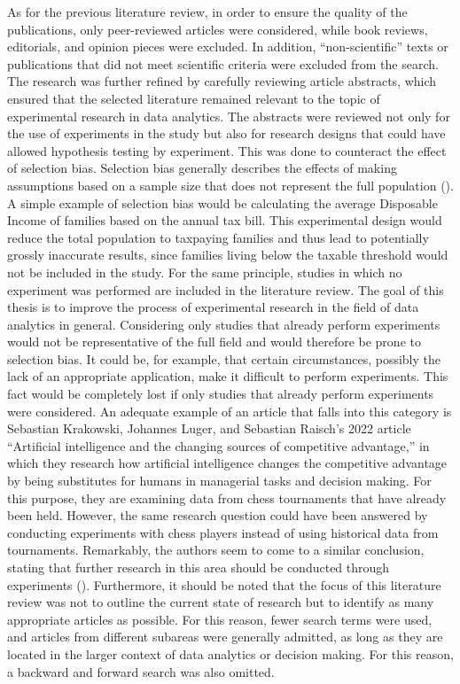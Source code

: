 As for the previous literature review, in order to ensure the quality of the publications, only peer-reviewed articles were considered, while book reviews, editorials, and opinion pieces were excluded. In addition, \enquote{non-scientific} texts or publications that did not meet scientific criteria were excluded from the search. The research was further refined by carefully reviewing article abstracts, which ensured that the selected literature remained relevant to the topic of experimental research in data analytics. The abstracts were reviewed not only for the use of experiments in the study but also for research designs that could have allowed hypothesis testing by experiment. This was done to counteract the effect of selection bias. Selection bias generally describes the effects of making assumptions based on a sample size that does not represent the full population (\cite{Heckman.2010}). A simple example of selection bias would be calculating the average Disposable Income of families based on the annual tax bill. This experimental design would reduce the total population to taxpaying families and thus lead to potentially grossly inaccurate results, since families living below the taxable threshold would not be included in the study. For the same principle, studies in which no experiment was performed are included in the literature review. The goal of this thesis is to improve the process of experimental research in the field of data analytics in general. Considering only studies that already perform experiments would not be representative of the full field and would therefore be prone to selection bias. It could be, for example, that certain circumstances, possibly the lack of an appropriate application, make it difficult to perform experiments. This fact would be completely lost if only studies that already perform experiments were considered. An adequate example of an article that falls into this category is Sebastian Krakowski, Johannes Luger, and Sebastian Raisch's 2022 article \enquote{Artificial intelligence and the changing sources of competitive advantage,} in which they research how artificial intelligence changes the competitive advantage by being substitutes for humans in managerial tasks and decision making. For this purpose, they are examining data from chess tournaments that have already been held. However, the same research question could have been answered by conducting experiments with chess players instead of using historical data from tournaments. Remarkably, the authors seem to come to a similar conclusion, stating that further research in this area should be conducted through experiments (\cite{Krakowski.2022}). Furthermore, it should be noted that the focus of this literature review was not to outline the current state of research but to identify as many appropriate articles as possible. For this reason, fewer search terms were used, and articles from different subareas were generally admitted, as long as they are located in the larger context of data analytics or decision making. For this reason, a backward and forward search was also omitted.
